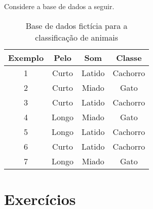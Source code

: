 \documentclass[12pt,a4paper, brazil]{article}
\begin{document}
Considere a base de dados a seguir.

\begin{table}[ht]
    \centering
    \begin{tabular}{|c|c|c|c|}
    \hline
    Exemplo & Pelo & Som & Classe \\
    \hline
    1 & Curto & Latido & Cachorro \\
    2 & Curto & Miado & Gato \\
    3 & Curto & Latido & Cachorro \\
    4 & Longo & Miado & Gato \\
    5 & Longo & Latido & Cachorro \\
    6 & Curto & Latido & Cachorro \\
    7 & Longo & Miado & Gato \\
    \hline
    \end{tabular}
    \caption{Base de dados fictícia para a classificação de animais}
    \label{tab:base-de-dados}
\end{table}

\section{Exercícios}
\end{document}
